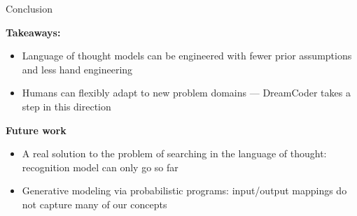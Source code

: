 \documentclass{beamer}
\begin{document}
\begin{frame}{Conclusion}

  \textbf{Takeaways:}
  \begin{itemize}
  \item Language of thought models can be engineered with fewer prior assumptions and less hand engineering
    \item Humans can flexibly adapt to new problem domains --- DreamCoder takes a step in this direction
  \end{itemize}
  \pause

  \textbf{Future work}

  \begin{itemize}
  \item A real solution to the problem of searching in the language of thought: recognition model can only go so far
    \pause
    \item Generative modeling via probabilistic programs: input/output mappings do not capture many of our concepts
    \end{itemize}

  \end{frame}
\end{document}
